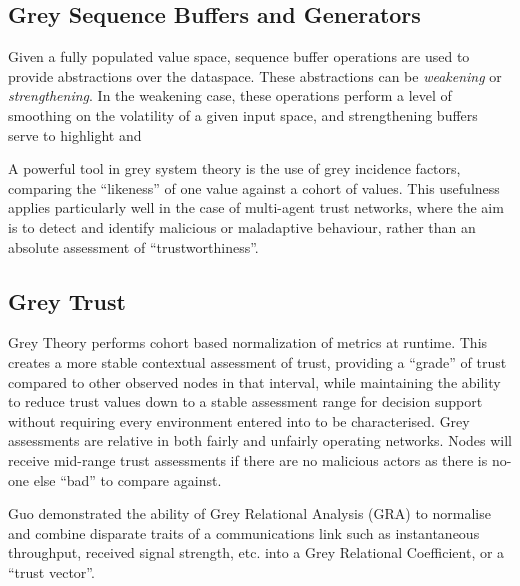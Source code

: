 \documentclass[conference]{IEEEtran}
\begin{document}
\subsection{Grey Sequence Buffers and Generators}


Given a fully populated value space, sequence buffer operations are used to provide abstractions over the dataspace.
These abstractions can be \emph{weakening} or \emph{strengthening}.
In the weakening case, these operations perform a level of smoothing on the volatility of a given input space, and strengthening buffers serve to highlight and 

A powerful tool in grey system theory is the use of grey incidence factors, comparing the ``likeness'' of one value against a cohort of values.
This usefulness applies particularly well in the case of multi-agent trust networks, where the aim is to detect and identify malicious or maladaptive behaviour, rather than an absolute assessment of ``trustworthiness''.

\subsection{Grey Trust}

Grey Theory performs cohort based normalization of metrics at runtime. 
This creates a more stable contextual assessment of trust, providing a ``grade'' of trust compared to other observed nodes in that interval, while maintaining the ability to reduce trust values down to a stable assessment range for decision support without requiring every environment entered into to be characterised.
Grey assessments are relative in both fairly and unfairly operating networks.
Nodes will receive mid-range trust assessments if there are no malicious actors as there is no-one else ``bad'' to compare against.

Guo\cite{Guo11} demonstrated the ability of Grey Relational Analysis (GRA)\cite{Zuo1995} to normalise and combine disparate traits of a communications link such as instantaneous throughput, received signal strength, etc. into a Grey Relational Coefficient, or a ``trust vector''.
\end{document}
